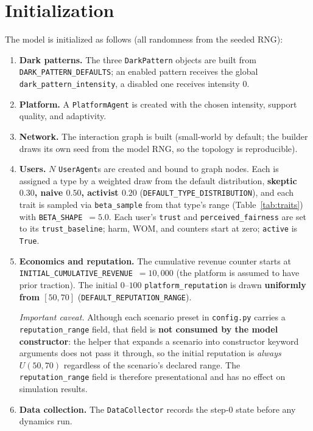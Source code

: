 \documentclass[11pt]{article}
\newcommand{\code}[1]{\texttt{#1}}
\begin{document}
\section{Initialization}
\label{sec:init}

The model is initialized as follows (all randomness from the seeded RNG):

\begin{enumerate}
  \item \textbf{Dark patterns.} The three \code{DarkPattern} objects are built
  from \code{DARK\_PATTERN\_DEFAULTS}; an enabled pattern receives the global
  \code{dark\_pattern\_intensity}, a disabled one receives intensity $0$.
  \item \textbf{Platform.} A \code{PlatformAgent} is created with the chosen
  intensity, support quality, and adaptivity.
  \item \textbf{Network.} The interaction graph is built (small-world by default;
  the builder draws its own seed from the model RNG, so the topology is
  reproducible).
  \item \textbf{Users.} $N$ \code{UserAgent}s are created and bound to graph
  nodes. Each is assigned a type by a weighted draw from the default
  distribution, \textbf{skeptic $0.30$, naive $0.50$, activist $0.20$}
  (\code{DEFAULT\_TYPE\_DISTRIBUTION}), and each trait is sampled via
  \code{beta\_sample} from that type's range (Table~\ref{tab:traits}) with
  \code{BETA\_SHAPE}~$=5.0$. Each user's \code{trust} and
  \code{perceived\_fairness} are set to its \code{trust\_baseline}; harm, WOM,
  and counters start at zero; \code{active} is \code{True}.
  \item \textbf{Economics and reputation.} The cumulative revenue counter starts
  at \code{INITIAL\_CUMULATIVE\_REVENUE}~$=10{,}000$ (the platform is assumed to
  have prior traction). The initial $0$--$100$ \code{platform\_reputation} is
  drawn \textbf{uniformly from $[50, 70]$} (\code{DEFAULT\_REPUTATION\_RANGE}).

  \emph{Important caveat.} Although each scenario preset in
  \code{config.py} carries a \code{reputation\_range} field, that field is
  \textbf{not consumed by the model constructor}: the helper that expands a
  scenario into constructor keyword arguments does not pass it through, so the
  initial reputation is \emph{always} $U(50,70)$ regardless of the scenario's
  declared range. The \code{reputation\_range} field is therefore presentational
  and has no effect on simulation results.
  \item \textbf{Data collection.} The \code{DataCollector} records the step-0
  state before any dynamics run.
\end{enumerate}
\end{document}
